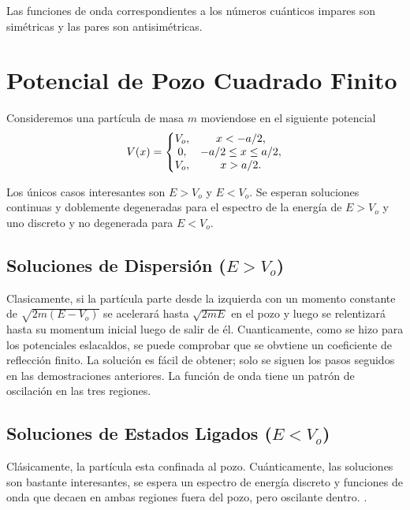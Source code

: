 Las funciones de onda correspondientes a los números cuánticos impares son simétricas y las pares son antisimétricas.



\section{Potencial de Pozo Cuadrado Finito}
Consideremos una partícula de masa $m$ moviendose en el siguiente potencial
	\begin{equation}
		V(x) = \left\{ \mqty{ V_o , & x<-a/2, \\ 0, & -a/2 \leq x \leq a/2, \\ V_o, & x > a/2. } \right.
	\end{equation}

Los únicos casos interesantes son $E > V_o$ y $E < V_o$. Se esperan soluciones continuas y doblemente degeneradas para el espectro de la energía de $E > V_o$ y uno discreto y no degenerada para $E < V_o$.


\subsection{Soluciones de Dispersión ($E > V_o$)}
Clasicamente, si la partícula parte desde la izquierda con un momento constante de $\sqrt{2m(E - V_o)}$ se acelerará hasta $\sqrt{2mE}$ en el pozo y luego se relentizará hasta su momentum inicial luego de salir de él. Cuanticamente, como se hizo para los potenciales eslacaldos, se puede comprobar que se obvtiene un coeficiente de reflección finito. La solución es fácil de obtener; solo se siguen los pasos seguidos en las demostraciones anteriores. La función de onda tiene un patrón de oscilación en las tres regiones.



\subsection{Soluciones de Estados Ligados ($E < V_o$)}
Clásicamente, la partícula esta confinada al pozo. Cuánticamente, las soluciones son bastante interesantes, se espera un espectro de energía discreto y funciones de onda que decaen en ambas regiones fuera del pozo, pero oscilante dentro. .














